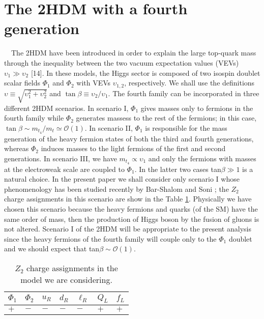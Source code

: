 \documentclass[a4paper]{jpconf}
\begin{document}
\section{The 2HDM with a fourth generation}
\ \
The 2HDM have been introduced in order to explain the large top-quark mass through the inequality between the two vacuum expectation values (VEVs) $ \upsilon_{1}\gg \upsilon_{2}$ [14]. In these models, the Higgs sector is composed of two isospin doublet scalar fields $ \Phi_{1}$ and $ \Phi_{2}$ with VEVs $\upsilon_{1,2}$, respectively. We shall use the definitions $ \upsilon\equiv\sqrt{\upsilon_{1}^{2}+\upsilon_{2}^{2}} $ and $\tan \beta\equiv\upsilon_{2}/\upsilon_{1} $. The fourth family can be incorporated in three different 2HDM scenarios\cite{BarShalom:2011zj}. In scenario I, $\Phi_{1}$ gives masses only to fermions in the fourth family while $\Phi_{2}$ generates massess to the rest of the fermions; in this case, $ \tan\beta \sim m_{t_4}/m_{t} \simeq \mathcal{O}(1) $. In scenario II, $\Phi_{1} $ is responsible for the mass generation of the heavy fermion states of both the third and fourth generations, whereas $\Phi_{2}$ induces masses to the light fermions of the first and second generations. In scenario III, we have $m_{t_{4}}\propto \upsilon_{1}$ and only the fermions with masses at the electroweak scale are coupled to $ \Phi_{1}$. In the latter two cases tan$\beta \gg 1$ is a natural choice. In the present paper we shall consider only scenario I whose phenomenology has been studied recently by Bar-Shalom and Soni \cite{BARSHALOM20171}; the $ Z_{2} $ charge assignments in this scenario are show in the Table \ref{Z2}. Physically we have chosen this scenario because the heavy fermions and quarks (of the SM) have the same order of mass, then the production of Higgs boson by the fusion of gluons is not altered. Scenario I of the 2HDM will be appropriate to the present analysis since the heavy fermions of the fourth family will couple only to the $ \Phi_{1} $ doublet and we should expect that tan$ \beta \sim \mathcal{O}(1) $.

\begin{table}[htbp]
\begin{center}
\centering
\begin{tabular}{|l|l|l|l|l|l|l|}
\hline
 $\Phi_{1}$ &$\Phi_{2} $ &$u_{R} $ &$d_{R} $ &$\ell_{R} $ &$Q_{L} $&$f_{L} $ \\
\hline
$ + $&$ - $& $ - $&$ - $&$ - $& $ + $&$ + $ \\
\hline
\end{tabular}
\caption{$ Z_{2} $ charge assignments in the model we are considering.}
\label{Z2}
\end{center}
\end{table}
\end{document}
